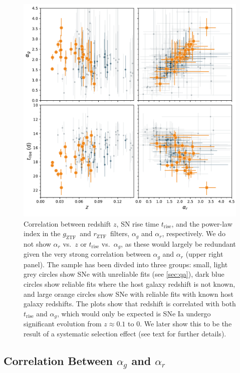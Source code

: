 \documentclass[twocolumn]{./aastex63}
\newcommand{\rztf}{$r_\mathrm{ZTF}$}
\newcommand{\gztf}{$g_\mathrm{ZTF}$}
\begin{document}
\begin{figure}
    \centering
    \includegraphics[width=6in]{./figures/param_correlations.pdf}
    \caption{Correlation between redshift $z$, SN rise time
    $t_\mathrm{rise}$, and the power-law index in the \gztf\ and \rztf\
    filters, $\alpha_g$ and $\alpha_r$, respectively. We do not show
    $\alpha_r$ vs.~$z$ or $t_\mathrm{rise}$ vs.~$\alpha_g$, as these would
    largely be redundant given the very strong correlation between $\alpha_g$
    and $\alpha_r$ (upper right panel). The sample has been divded into three
    groups: small, light grey circles show SNe with unreliable fits (see
    \ref{sec:qa}), dark blue circles show reliable fits where the host
    galaxy redshift is not known, and large orange circles show SNe with
    reliable fits with known host galaxy redshifts. The plots show that
    redshift is correlated with both $t_\mathrm{rise}$ and $\alpha_g$, which
    would only be expected is SNe Ia undergo significant evolution from $z
    \approx 0.1$ to $0$. We later show this to be the result of a systematic
    selection effect (see text for further details). }
    \label{fig:model_parameters}
\end{figure}

\subsection{Correlation Between $\alpha_g$ and $\alpha_r$}
\end{document}
